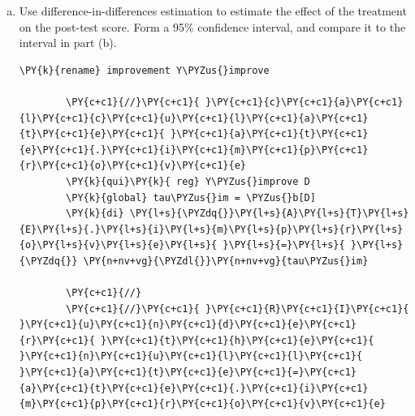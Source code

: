 \documentclass[11pt,notitlepage]{article}\usepackage[]{graphicx}\usepackage[]{color}
\makeatletter
\newenvironment{kframe}{%
 \def\at@end@of@kframe{}%
 \ifinner\ifhmode%
  \def\at@end@of@kframe{\end{minipage}}%
  \begin{minipage}{\columnwidth}%
 \fi\fi%
 \def\FrameCommand##1{\hskip\@totalleftmargin \hskip-\fboxsep
 \colorbox{shadecolor}{##1}\hskip-\fboxsep
     \hskip-\linewidth \hskip-\@totalleftmargin \hskip\columnwidth}%
 \MakeFramed {\advance\hsize-\width
   \@totalleftmargin\z@ \linewidth\hsize
   \@setminipage}}%
 {\par\unskip\endMakeFramed%
 \at@end@of@kframe}
\newenvironment{knitrout}{}{} %
\makeatother
\begin{document}
\begin{enumerate}[a)]
\begin{knitrout}
\begin{kframe}
\begin{Verbatim}[commandchars=\\\{\}]
 p=0.50428 [one-tailed test of Ho:  theta(D==0)<=theta(D==1)]
 p=0.50000 [one-tailed test of Ho:  theta(D==0)>=theta(D==1)]
 p=0.76450 [two-tailed test of Ho:  theta(D==0)==theta(D==1)]

Saving log file to ate\_ci.dta{\ldots}done.



(1 observation deleted)


(-2.259, 1.593)


    \end{Verbatim}

\end{kframe}
\end{knitrout}

We obtained a difference-in-means estimate of the ATE of \ensuremath{-0.3333333} and a 95\% confidence interval of [\ensuremath{-2.259}, 1.593]. This confidence interval is wide enough to include much larger and much smaller treatment effects -- even crossing zero.

\item Use difference-in-differences estimation to estimate the effect of the treatment on the post-test score. Form a 95\% confidence interval, and compare it to the interval in part (b).

\begin{knitrout}
\color{fgcolor}\begin{kframe}
   \begin{Verbatim}[commandchars=\\\{\}]
	\PY{k}{rename} improvement Y\PYZus{}improve 
        
        \PY{c+c1}{//}\PY{c+c1}{ }\PY{c+c1}{c}\PY{c+c1}{a}\PY{c+c1}{l}\PY{c+c1}{c}\PY{c+c1}{u}\PY{c+c1}{l}\PY{c+c1}{a}\PY{c+c1}{t}\PY{c+c1}{e}\PY{c+c1}{ }\PY{c+c1}{a}\PY{c+c1}{t}\PY{c+c1}{e}\PY{c+c1}{.}\PY{c+c1}{i}\PY{c+c1}{m}\PY{c+c1}{p}\PY{c+c1}{r}\PY{c+c1}{o}\PY{c+c1}{v}\PY{c+c1}{e}
        \PY{k}{qui}\PY{k}{ reg} Y\PYZus{}improve D
        \PY{k}{global} tau\PYZus{}im = \PYZus{}b[D]
        \PY{k}{di} \PY{l+s}{\PYZdq{}}\PY{l+s}{A}\PY{l+s}{T}\PY{l+s}{E}\PY{l+s}{.}\PY{l+s}{i}\PY{l+s}{m}\PY{l+s}{p}\PY{l+s}{r}\PY{l+s}{o}\PY{l+s}{v}\PY{l+s}{e}\PY{l+s}{ }\PY{l+s}{=}\PY{l+s}{ }\PY{l+s}{\PYZdq{}} \PY{n+nv+vg}{\PYZdl{}}\PY{n+nv+vg}{tau\PYZus{}im}
        
        \PY{c+c1}{//}
        \PY{c+c1}{//}\PY{c+c1}{ }\PY{c+c1}{R}\PY{c+c1}{I}\PY{c+c1}{ }\PY{c+c1}{u}\PY{c+c1}{n}\PY{c+c1}{d}\PY{c+c1}{e}\PY{c+c1}{r}\PY{c+c1}{ }\PY{c+c1}{t}\PY{c+c1}{h}\PY{c+c1}{e}\PY{c+c1}{ }\PY{c+c1}{n}\PY{c+c1}{u}\PY{c+c1}{l}\PY{c+c1}{l}\PY{c+c1}{ }\PY{c+c1}{a}\PY{c+c1}{t}\PY{c+c1}{e}\PY{c+c1}{=}\PY{c+c1}{a}\PY{c+c1}{t}\PY{c+c1}{e}\PY{c+c1}{.}\PY{c+c1}{i}\PY{c+c1}{m}\PY{c+c1}{p}\PY{c+c1}{r}\PY{c+c1}{o}\PY{c+c1}{v}\PY{c+c1}{e}
        

\end{Verbatim}
\end{kframe}
\end{knitrout}
\end{enumerate}
\end{document}
